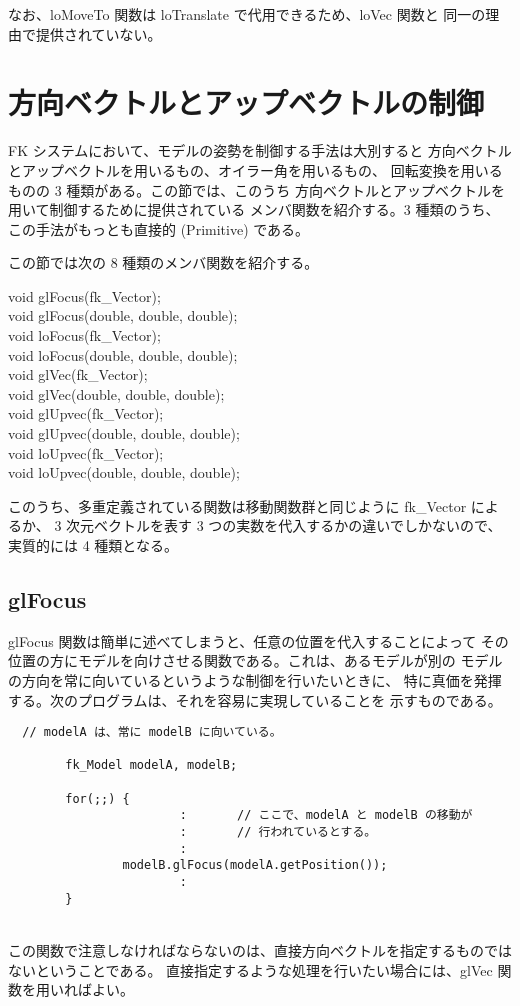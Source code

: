 なお、loMoveTo 関数は loTranslate で代用できるため、loVec 関数と
同一の理由で提供されていない。
\section{方向ベクトルとアップベクトルの制御}
FK システムにおいて、モデルの姿勢を制御する手法は大別すると
方向ベクトルとアップベクトルを用いるもの、オイラー角を用いるもの、
回転変換を用いるものの 3 種類がある。この節では、このうち
方向ベクトルとアップベクトルを用いて制御するために提供されている
メンバ関数を紹介する。3 種類のうち、この手法がもっとも直接的
(Primitive) である。

この節では次の 8 種類のメンバ関数を紹介する。
\begin{description}
\item[void glFocus(fk\_Vector);]
\item[void glFocus(double, double, double);]
\item[void loFocus(fk\_Vector);]
\item[void loFocus(double, double, double);]
\item[void glVec(fk\_Vector);]
\item[void glVec(double, double, double);]
\item[void glUpvec(fk\_Vector);]
\item[void glUpvec(double, double, double);]
\item[void loUpvec(fk\_Vector);]
\item[void loUpvec(double, double, double);]
\end{description}

このうち、多重定義されている関数は移動関数群と同じように fk\_Vector によるか、
3 次元ベクトルを表す 3 つの実数を代入するかの違いでしかないので、
実質的には 4 種類となる。
\subsection{glFocus}
glFocus 関数は簡単に述べてしまうと、任意の位置を代入することによって
その位置の方にモデルを向けさせる関数である。これは、あるモデルが別の
モデルの方向を常に向いているというような制御を行いたいときに、
特に真価を発揮する。次のプログラムは、それを容易に実現していることを
示すものである。
\\
\begin{breakbox}
\begin{verbatim}
  // modelA は、常に modelB に向いている。

        fk_Model modelA, modelB;

        for(;;) {
                        :       // ここで、modelA と modelB の移動が
                        :       // 行われているとする。
                        :
                modelB.glFocus(modelA.getPosition());
                        :
        }
\end{verbatim}
\end{breakbox}
~ \\
この関数で注意しなければならないのは、直接方向ベクトルを指定するものでは
ないということである。
直接指定するような処理を行いたい場合には、glVec 関数を用いればよい。
